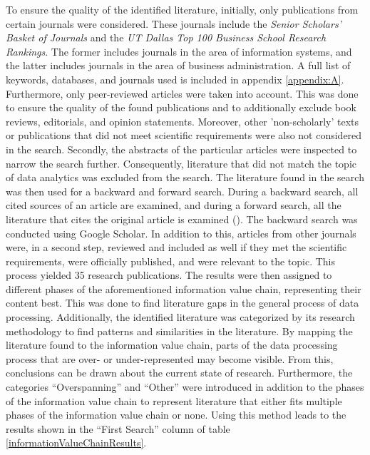To ensure the quality of the identified literature, initially, only publications from certain journals were considered. These journals include the \textit{Senior Scholars' Basket of Journals} and the \textit{UT Dallas Top 100 Business School Research Rankings}. The former includes journals in the area of information systems, and the latter includes journals in the area of business administration. A full list of keywords, databases, and journals used is included in appendix \ref{appendix:A}. Furthermore, only peer-reviewed articles were taken into account. This was done to ensure the quality of the found publications and to additionally exclude book reviews, editorials, and opinion statements. Moreover, other 'non-scholarly' texts or publications that did not meet scientific requirements were also not considered in the search. Secondly, the abstracts of the particular articles were inspected to narrow the search further. Consequently, literature that did not match the topic of data analytics was excluded from the search. The literature found in the search was then used for a backward and forward search. During a backward search, all cited sources of an article are examined, and during a forward search, all the literature that cites the original article is examined (\cite{Webster.2002}). The backward search was conducted using Google Scholar. In addition to this, articles from other journals were, in a second step, reviewed and included as well if they met the scientific requirements, were officially published, and were relevant to the topic. This process yielded 35 research publications. The results were then assigned to different phases of the aforementioned information value chain, representing their content best. This was done to find literature gaps in the general process of data processing. Additionally, the identified literature was categorized by its research methodology to find patterns and similarities in the literature. By mapping the literature found to the information value chain, parts of the data processing process that are over- or under-represented may become visible. From this, conclusions can be drawn about the current state of research. Furthermore, the categories \enquote{Overspanning} and \enquote{Other} were introduced in addition to the phases of the information value chain to represent literature that either fits multiple phases of the information value chain or none. Using this method leads to the results shown in the \enquote{First Search} column of table \ref{informationValueChainResults}.


